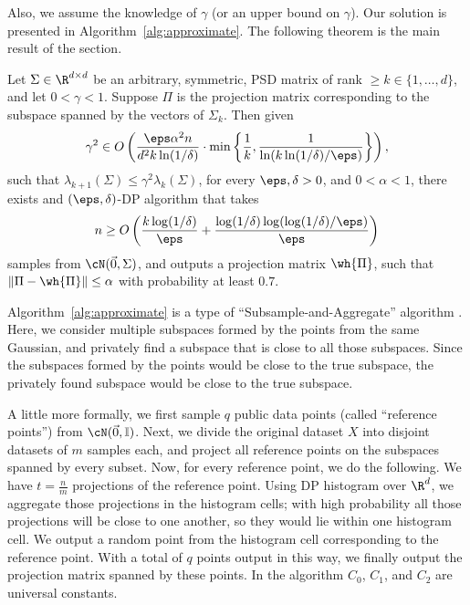Also, we assume the
knowledge of $\gamma$ (or an upper bound on $\gamma$). Our solution
is presented in Algorithm~\ref{alg:approximate}. The following
theorem is the main result of the section.

\begin{theorem}\label{thm:approximate}
    Let $\Sigma \in \R^{d \times d}$ be an arbitrary, symmetric, PSD
    matrix of rank $\geq k \in \{1,\dots,d\}$, and let $0 < \gamma < 1$.
    Suppose $\Pi$ is the projection matrix corresponding
    to the subspace spanned by the vectors of $\Sigma_k$.
    Then given
    $$\gamma^2 \in
        O\left(\frac{\eps\alpha^2n}{d^{2}k\ln(1/\delta)}\cdot
        \min\left\{\frac{1}{k},
        \frac{1}{\ln(k\ln(1/\delta)/\eps)}
        \right\}\right),$$
    such that $\lambda_{k+1}(\Sigma) \leq \gamma^2\lambda_k(\Sigma)$,
    for every $\eps,\delta>0$, and $0 < \alpha < 1$,
    there exists and $(\eps,\delta)$-DP algorithm that takes
    $$n \geq O\left(\frac{k\log(1/\delta)}{\eps} +
        \frac{\log(1/\delta)\log(\log(1/\delta)/\eps)}{\eps}\right)$$
    samples from $\cN(\vec{0},\Sigma)$, and outputs a projection matrix $\wh{\Pi}$,
    such that $\|\Pi-\wh{\Pi}\| \leq \alpha$ with probability
    at least $0.7$.
\end{theorem}

Algorithm~\ref{alg:approximate} is a type of
``Subsample-and-Aggregate'' algorithm \cite{NissimRS07}.
Here, we consider multiple subspaces formed by the points
from the same Gaussian, and privately find a subspace that
is close to all those subspaces. Since the subspaces formed
by the points would be close to the true subspace, the privately
found subspace would be close to the true subspace.

A little more formally, we first sample $q$ public data points
(called ``reference points'') from $\cN(\vec{0},\id)$. Next,
we divide the original dataset $X$ into disjoint datasets of $m$ samples
each, and project all reference points on the subspaces spanned
by every subset. Now, for every reference point, we do the
following. We have $t=\tfrac{n}{m}$ projections of the reference
point. Using DP histogram over $\R^d$, we aggregate those
projections in the histogram cells; with high probability
all those projections will be close to one another, so they
would lie within one histogram cell. We output a random point
from the histogram cell corresponding to the reference point.
With a total of $q$ points output in this way, we finally
output the projection matrix spanned by these points. In
the algorithm $C_0$, $C_1$, and $C_2$ are universal constants.

